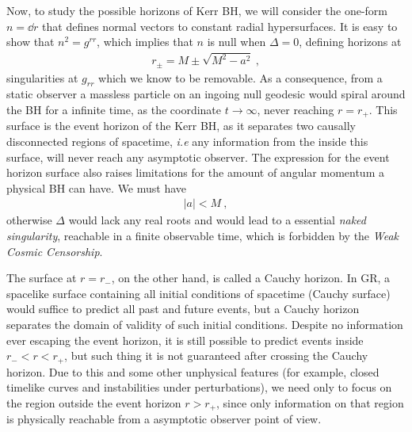Now, to study the possible horizons of Kerr BH, we will consider the one-form $n = \dd r$ that defines normal vectors to constant radial hypersurfaces.
It is easy to show that $n^2 = g^{rr}$, which implies that $n$ is null when $\Delta=0$, defining horizons at 
\begin{align}
    r_\pm = M \pm \sqrt{M^2 - a^2} ~,
    \label{eq2:KerrRadius}
\end{align}
singularities at $g_{rr}$ which we know to be removable.
As a consequence, from a static observer a massless particle on an ingoing null geodesic would spiral around the BH for a infinite time, as the coordinate $t\to\infty$, never reaching $r=r_{+}$.
This surface is the event horizon of the Kerr BH, as it separates two causally disconnected regions of spacetime, \emph{i.e} any information from the inside this surface, will never reach any asymptotic observer. 
The expression for the event horizon surface also raises limitations for the amount of angular momentum a physical BH can have.
We must have 
\begin{align}
    |a| < M ~,
    \label{eq2:spinLimit}
\end{align}
otherwise $\Delta$ would lack any real roots and would lead to a essential \emph{naked singularity}, reachable in a finite observable time, which is forbidden by the \emph{Weak Cosmic Censorship}.  

The surface at $r=r_{-}$, on the other hand, is called a Cauchy horizon.
In GR, a spacelike surface containing all initial conditions of spacetime (Cauchy surface) would suffice to predict all past and future events, but a Cauchy horizon separates the domain of validity of such initial conditions.
Despite no information ever escaping the event horizon, it is still possible to predict events inside $r_{-} < r < r_{+}$, but such thing it is not guaranteed after crossing the Cauchy horizon.
Due to this and some other unphysical features (for example, closed timelike curves and instabilities under perturbations), we need only to focus on the region outside the event horizon $r>r_{+}$, since only information on that region is physically reachable from a asymptotic observer point of view.

